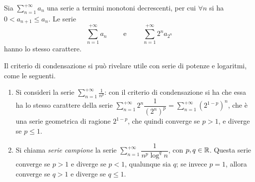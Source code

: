 \begin{teorema}
Sia $\sum_{n=1}^{+\infty}a_n$ una serie a termini monotoni decrescenti, per cui $\forall n$ si ha $0<a_{n+1}\leq a_n$. Le serie
\[
\sum_{n=1}^{+\infty}a_n\qquad\text{ e }\qquad\sum_{n=1}^{+\infty}2^na_{2^n}
\]
hanno lo stesso carattere.
\end{teorema}
\begin{esempio} \label{es:serie-criterio-condensazione}
	Il criterio di condensazione si può rivelare utile con serie di potenze e logaritmi, come le seguenti.
	\begin{enumerate}
		\item Si consideri la serie $\sum_{n=1}^{+\infty}\frac1{n^p}$: con il criterio di condensazione si ha che essa ha lo stesso carattere della serie $\sum_{n=1}^{+\infty}2^n\dfrac1{(2^n)^p}=\sum_{n=1}^{+\infty}(2^{1-p})^n$, che è una serie geometrica di ragione $2^{1-p}$, che quindi converge se $p>1$, e diverge se $p\leq 1$.
		\item Si chiama \emph{serie campione} la serie $\sum_{n=1}^{+\infty}\dfrac1{n^p\log^q n}$, con $p,q\in\mathbb{R}$. Questa serie converge se $p>1$ e diverge se $p<1$, qualunque sia $q$; se invece $p=1$, allora converge se $q>1$ e diverge se $q\leq 1$.
	\end{enumerate}
\end{esempio}

